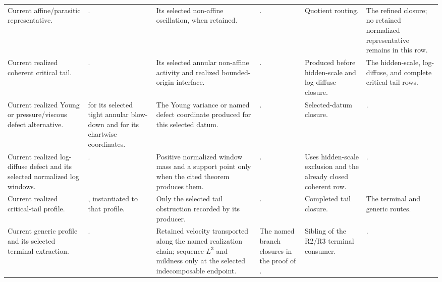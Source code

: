 \documentclass[11pt]{amsart}
\numberwithin{equation}{section}
\theoremstyle{plain}
\theoremstyle{definition}
\theoremstyle{remark}
\begin{document}
\begin{longtable}{@{}L{0.14\textwidth}L{0.19\textwidth}L{0.17\textwidth}L{0.17\textwidth}L{0.10\textwidth}L{0.14\textwidth}@{}}
Current affine/parasitic representative. &
. &
Its selected non-affine oscillation, when retained. &
. &
Quotient routing. &
The refined closure; no retained normalized representative remains in this
row.\\

Current realized coherent critical tail. &
. &
Its selected annular non-affine activity and realized bounded-origin
interface. &
. &
Produced before hidden-scale and log-diffuse closure. &
The hidden-scale, log-diffuse, and complete critical-tail rows.\\

Current realized Young or pressure/viscous defect alternative. &
 for its selected tight
annular blow-down and  for
its chartwise coordinates. &
The Young variance or named defect coordinate produced for this selected
datum. &
. &
Selected-datum closure. &
.\\

Current realized log-diffuse defect and its selected normalized log windows. &
. &
Positive normalized window mass and a support point only when the cited theorem
produces them. &
. &
Uses hidden-scale exclusion and the already closed coherent row. &
.\\

Current realized critical-tail profile. &
, instantiated to that profile. &
Only the selected tail obstruction recorded by its producer. &
. &
Completed tail closure. &
The terminal and generic routes.\\

Current generic profile and its selected terminal extraction. &
. &
Retained velocity transported along the named realization chain;
sequence-\(L^3\) and mildness only at the selected indecomposable endpoint. &
The named branch closures in the proof of . &
Sibling of the R2/R3 terminal consumer. &
.\\


\end{longtable}
\end{document}
